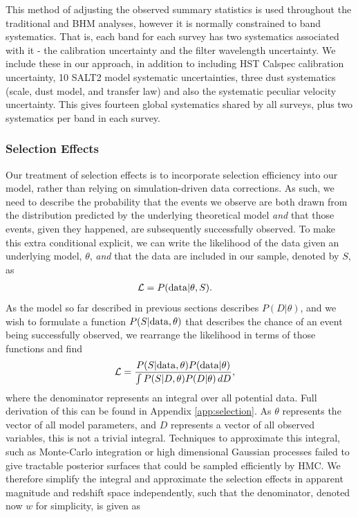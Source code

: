 \documentclass[a4paper,fleqn,usenatbib]{mnras}
\begin{document}
This method of adjusting the observed summary statistics is used throughout the traditional and BHM analyses, however it is normally constrained to band systematics. That is, each band for each survey has two systematics associated with it - the calibration uncertainty and the filter wavelength uncertainty. We include these in our approach, in addition to including HST Calspec calibration uncertainty, 10 SALT2 model systematic uncertainties, three dust systematics (scale, dust model, and transfer law) and also the systematic peculiar velocity uncertainty. This gives fourteen global systematics shared by all surveys, plus two systematics per band in each survey.

\subsubsection{Selection Effects}
\label{sec:selection}
Our treatment of selection effects is to incorporate selection efficiency into our model, rather than relying on simulation-driven data corrections. As such, we need to describe the probability that the events we observe are both drawn from the distribution predicted by the underlying theoretical model \textit{and} that those events, given they happened, are subsequently successfully observed.  To make this extra conditional explicit, we can write the likelihood of the data given an underlying model, $\theta$, \textit{and} that the data are included in our sample, denoted by $S$, as
\begin{align}
\mathcal{L} &= P({\rm data} | \theta, S). \label{eq:like}
\end{align}
As the model so far described in previous sections describes $P(D|\theta)$, and we wish to formulate a function $P(S|{\rm data},\theta)$ that describes the chance of an event being successfully observed, we rearrange the likelihood in terms of those functions and find
\begin{align}
\mathcal{L} &= \frac{P(S|{\rm data},\theta) P({\rm data}|\theta)}{\int P(S | D, \theta) P(D|\theta)\, dD}, \label{eq:main}
\end{align}
where the denominator represents an integral over all potential data. Full derivation of this can be found in Appendix \ref{app:selection}. As $\theta$ represents the vector of all model parameters, and $D$ represents a vector of all observed variables, this is not a trivial integral. Techniques to approximate this integral, such as Monte-Carlo integration or high dimensional Gaussian processes failed to give tractable posterior surfaces that could be sampled efficiently by HMC. We therefore simplify the integral and approximate the selection effects in apparent magnitude and redshift space independently, such that the denominator, denoted now $w$ for simplicity, is given as
\end{document}
